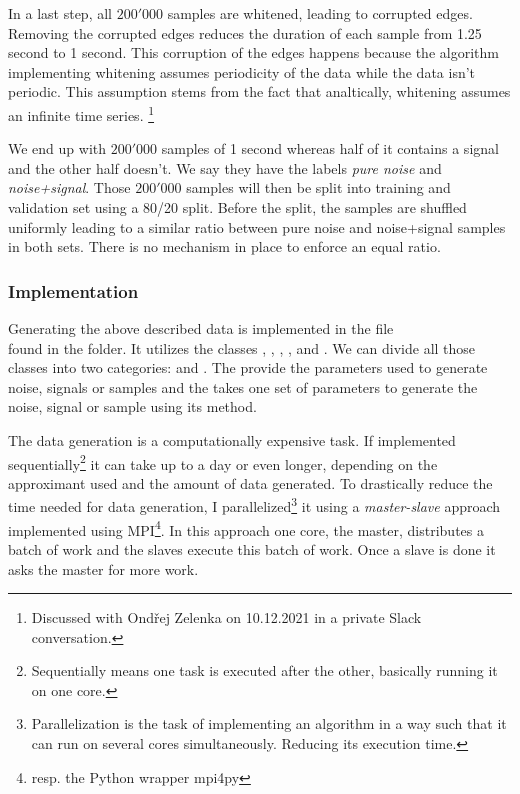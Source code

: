 In a last step, all $200'000$ samples are whitened, leading to corrupted edges.
Removing the corrupted edges reduces the duration of each sample from
1.25 second to 1 second. This corruption of the edges happens because the
algorithm implementing whitening
assumes periodicity of the data while the data isn't periodic. This assumption
stems from the fact that analtically, whitening assumes an infinite time series.
\footnote{Discussed with Ondřej Zelenka on 10.12.2021 in a private Slack
  conversation.} 

We end up with $200'000$ samples of 1 second whereas half of it contains a signal
and the other half doesn't. We say they have the labels \textit{pure noise} and 
\textit{noise+signal}. Those $200'000$ samples will then be split into
training and validation set using a 80/20 split. Before the split, the samples
are shuffled uniformly leading to a similar ratio between
pure noise and noise+signal samples in both sets. There is no mechanism in place
to enforce an equal ratio.

\subsubsection{Implementation}
Generating the above described data is implemented in the file \\
 found in the  folder. It utilizes
the classes , , ,
,  and . We can divide
all those classes into two categories:  and . The
 provide the parameters used to generate noise, signals or samples
and the  takes one set of parameters to generate the noise,
signal or sample using its  method.

The data generation is a computationally expensive task. If implemented
sequentially\footnote{Sequentially means one task is executed after the other,
basically running it on one core.} it can take
up to a day or even longer, depending on the approximant used and the
amount of data generated. To drastically reduce the time needed for data
generation, I parallelized\footnote{Parallelization is the task of implementing
an algorithm in a way such that it can run on several cores simultaneously.
Reducing its execution time.} it using a \textit{master-slave} approach
implemented using MPI\footnote{resp. the Python wrapper mpi4py}. In
this approach one core, the master, distributes a batch of work and the slaves
execute this batch of work. Once a slave is done it asks the master for more
work.

